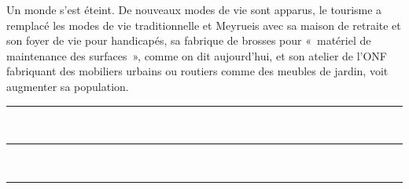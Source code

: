 Un monde s’est éteint. De nouveaux modes de vie sont apparus, le tourisme a remplacé les
modes de vie traditionnelle et Meyrueis avec sa maison de retraite et son foyer de vie pour
handicapés, sa fabrique de brosses pour «~matériel de maintenance des surfaces~», comme on
dit aujourd’hui, et son atelier de l’ONF fabriquant des mobiliers urbains ou routiers comme
des meubles de jardin, voit augmenter sa population.

\vspace{2mm} %
\begin{center}
    \rule{0.4\textwidth}{0.4pt}\\[1mm] %
    \rule{0.2\textwidth}{0.4pt}\\[1mm] %
    \rule{0.1\textwidth}{0.4pt} %
\end{center}

